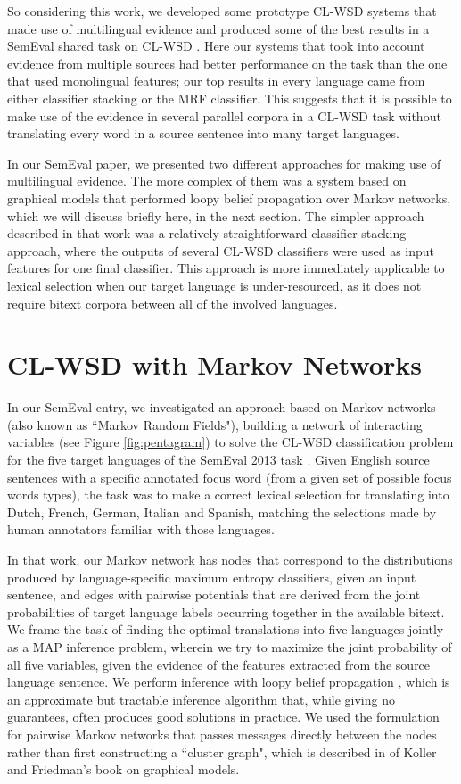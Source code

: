 So considering this work, we developed some prototype CL-WSD systems that made
use of multilingual evidence \cite{rudnick-liu-gasser:2013:SemEval-2013} and
produced some of the best results in a SemEval shared task on CL-WSD
\cite{task10}.
Here our systems that took into account evidence from multiple sources had
better performance on the task than the one that used monolingual features; our
top results in every language came from either classifier stacking or the MRF
classifier. This suggests that it is possible to make use of the evidence in
several parallel corpora in a CL-WSD task without translating every word in a
source sentence into many target languages.

In our SemEval paper, we presented two different approaches for
making use of multilingual evidence. The more complex of them was a system
based on graphical models that performed loopy belief propagation over Markov
networks, which we will discuss briefly here, in the next section.
The simpler approach described in that work was a relatively straightforward
classifier stacking approach, where the outputs of several CL-WSD classifiers
were used as input features for one final classifier. This approach is more
immediately applicable to lexical selection when our target language is
under-resourced, as it does not require bitext corpora between all of the
involved languages.

\section{CL-WSD with Markov Networks}
In our SemEval entry, we investigated an approach based on Markov networks
(also known as ``Markov Random Fields"), building a network of interacting
variables (see Figure \ref{fig:pentagram}) to solve the CL-WSD classification
problem for the five target languages of the SemEval 2013 task \cite{task10}.
Given English source sentences with a specific annotated focus word (from a
given set of possible focus words types), the task was to make a correct
lexical selection for translating into Dutch, French, German, Italian and
Spanish, matching the selections made by human annotators familiar with those
languages.

In that work, our Markov network has nodes that correspond to the distributions
produced by language-specific maximum entropy classifiers, given an input
sentence, and edges with pairwise potentials that are derived from the joint
probabilities of target language labels occurring together in the available
bitext.
We frame the task of finding the optimal translations into five languages
jointly as a MAP inference problem, wherein we try to maximize the joint
probability of all five variables, given the evidence of the features extracted
from the source language sentence.
We perform inference with loopy belief propagation
\cite{DBLP:conf/uai/MurphyWJ99}, which is an approximate but tractable
inference algorithm that, while giving no guarantees, often produces good
solutions in practice.
We used the formulation for pairwise Markov networks that passes messages
directly between the nodes rather than first constructing a ``cluster graph",
which is described in \cite[\S 11.3.5.1]{Koller+Friedman:09} of Koller and
Friedman's book on graphical models.

